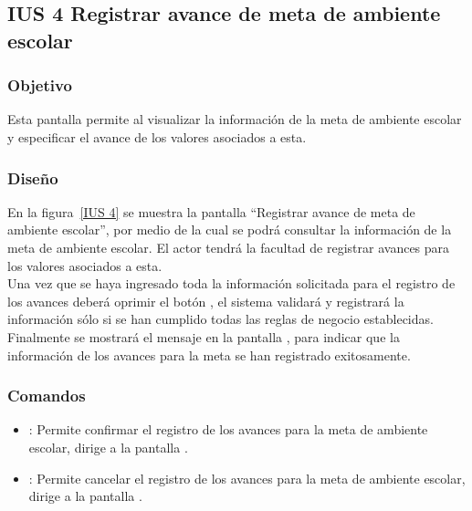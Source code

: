 \subsection{IUS 4 Registrar avance de meta de ambiente escolar}

\subsubsection{Objetivo}

Esta pantalla permite al  visualizar la información de la meta de ambiente escolar y especificar el avance de los valores asociados a esta.
    
\subsubsection{Diseño}

    En la figura~\ref{IUS 4} se muestra la pantalla ``Registrar avance de meta de ambiente escolar'', por medio de la cual se podrá consultar la información de la meta de ambiente escolar. El actor tendrá la facultad de registrar avances para los valores asociados a esta.\\
        
    Una vez que se haya ingresado toda la información solicitada para el registro de los avances deberá oprimir el botón , el sistema validará y registrará la información sólo si se han cumplido todas las reglas de negocio establecidas.\\
    
    Finalmente se mostrará el mensaje  en la pantalla , para indicar que la información de los avances para la meta se han registrado exitosamente.
        

\subsubsection{Comandos}
    \begin{itemize} 
    \item {}: Permite confirmar el registro de los avances para la meta de ambiente escolar, dirige a la pantalla .
    \item {}: Permite cancelar el registro de los avances para la meta de ambiente escolar, dirige a la pantalla .
    \end{itemize}

